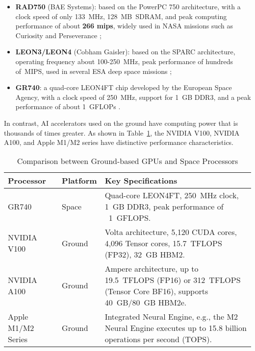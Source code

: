 \begin{itemize}

  \item \textbf{RAD750} (BAE Systems): based on the PowerPC 750 architecture, with a clock speed of only 133~MHz, 128~MB~SDRAM, and peak computing performance of about \textbf{266 \gls{mips}}, widely used in NASA missions such as Curiosity and Perseverance \cite{rad750};

  \item \textbf{LEON3/LEON4} (Cobham Gaisler): based on the SPARC architecture, operating frequency about 100-250~MHz, peak performance of hundreds of~MIPS, used in several ESA deep space missions \cite{leon34};

  \item \textbf{GR740}: a quad-core LEON4FT chip developed by the European Space Agency, with a clock speed of 250~MHz, support for 1~GB DDR3, and a peak performance of about 1~GFLOPs \cite{gr740}.

\end{itemize}



In contrast, AI accelerators used on the ground have computing power that is thousands of times greater. As shown in Table~\ref{tab:gpu_comparison}, the NVIDIA V100, NVIDIA A100, and Apple M1/M2 series have distinctive performance characteristics.

\begin{table}[H]
  \centering
  \caption{Comparison between Ground-based GPUs and Space Processors}
  \label{tab:gpu_comparison}
  \renewcommand{\arraystretch}{1.2}  %
  \setlength{\tabcolsep}{4pt}        %
  \begin{tabularx}{1\textwidth}{%
      >{\raggedright\arraybackslash}p{2.5cm}  %
      >{\raggedright\arraybackslash}p{1.5cm}  %
      >{\raggedright\arraybackslash}X          %
  }
    \toprule
    \textbf{Processor} & \textbf{Platform} & \textbf{Key Specifications} \\
    \midrule
    GR740 
      & Space 
      & Quad-core LEON4FT, 250~MHz clock, 1~GB DDR3, peak performance of ~1~GFLOPS. \\
    \midrule
    NVIDIA V100 
      & Ground 
      & Volta architecture, 5,120 CUDA cores, 4,096 Tensor cores, 15.7~TFLOPS (FP32), 32~GB HBM2. \\
    \midrule
    NVIDIA A100 
      & Ground 
      & Ampere architecture, up to 19.5~TFLOPS (FP16) or 312~TFLOPS (Tensor Core BF16), supports 40~GB/80~GB HBM2e. \\
    \midrule
    Apple M1/M2 Series 
      & Ground 
      & Integrated Neural Engine, e.g., the M2 Neural Engine executes up to 15.8 billion operations per second (TOPS). \\
    \bottomrule
  \end{tabularx}
\end{table}






